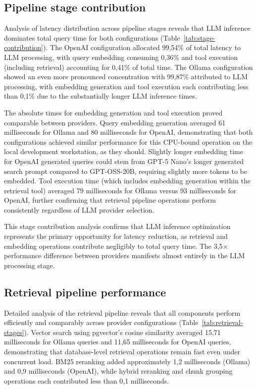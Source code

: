 \subsection{Pipeline stage contribution}
\label{subsec:pipeline-stage-contribution}

Analysis of latency distribution across pipeline stages reveals that LLM inference dominates total query time for both configurations (Table~\ref{tab:stage-contribution}). The OpenAI configuration allocated 99,54\% of total latency to LLM processing, with query embedding consuming 0,36\% and tool execution (including retrieval) accounting for 0,41\% of total time. The Ollama configuration showed an even more pronounced concentration with 99,87\% attributed to LLM processing, with embedding generation and tool execution each contributing less than 0,1\% due to the substantially longer LLM inference times.

The absolute times for embedding generation and tool execution proved comparable between providers. Query embedding generation averaged 61 milliseconds for Ollama and 80 milliseconds for OpenAI, demonstrating that both configurations achieved similar performance for this CPU-bound operation on the local development workstation, as they should. Slightly longer embedding time for OpenAI generated queries could stem from GPT-5 Nano's longer generated search prompt compared to GPT-OSS-20B, requiring slightly more tokens to be embedded. Tool execution time (which includes embedding generation within the retrieval tool) averaged 79 milliseconds for Ollama versus 93 milliseconds for OpenAI, further confirming that retrieval pipeline operations perform consistently regardless of LLM provider selection.

This stage contribution analysis confirms that LLM inference optimization represents the primary opportunity for latency reduction, as retrieval and embedding operations contribute negligibly to total query time. The 3,5$\times$ performance difference between providers manifests almost entirely in the LLM processing stage.

\subsection{Retrieval pipeline performance}
\label{subsec:retrieval-pipeline-performance}

Detailed analysis of the retrieval pipeline reveals that all components perform efficiently and comparably across provider configurations (Table~\ref{tab:retrieval-stages}). Vector search using pgvector's cosine similarity averaged 15,71 milliseconds for Ollama queries and 11,65 milliseconds for OpenAI queries, demonstrating that database-level retrieval operations remain fast even under concurrent load. BM25 reranking added approximately 1,2 milliseconds (Ollama) and 0,9 milliseconds (OpenAI), while hybrid reranking and chunk grouping operations each contributed less than 0,1 milliseconds.


